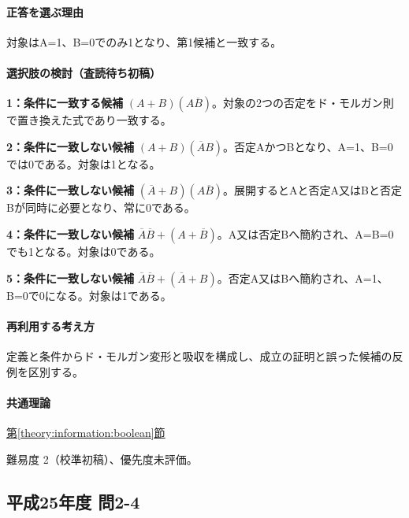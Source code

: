 \paragraph{正答を選ぶ理由} 対象はA=\allowbreak{}1、B=\allowbreak{}0でのみ1となり、第1候補と一致する。

\paragraph{選択肢の検討（査読待ち初稿）}\mbox{}\par

\noindent\textbf{1：条件に一致する候補} \((A+B)(A\overline B)\)。対象の2つの否定をド・モルガン則で置き換えた式であり一致する。\par

\noindent\textbf{2：条件に一致しない候補} \((A+B)(\overline A B)\)。否定AかつBとなり、A=\allowbreak{}1、B=\allowbreak{}0では0である。対象は1となる。\par

\noindent\textbf{3：条件に一致しない候補} \((\overline A+B)(A\overline B)\)。展開するとAと否定A又はBと否定Bが同時に必要となり、常に0である。\par

\noindent\textbf{4：条件に一致しない候補} \(\overline A\overline B+(A+\overline B)\)。A又は否定Bへ簡約され、A=\allowbreak{}B=\allowbreak{}0でも1となる。対象は0である。\par

\noindent\textbf{5：条件に一致しない候補} \(\overline A\overline B+(\overline A+B)\)。否定A又はBへ簡約され、A=\allowbreak{}1、B=\allowbreak{}0で0になる。対象は1である。\par

\paragraph{再利用する考え方} 定義と条件からド・モルガン変形と吸収を構成し、成立の証明と誤った候補の反例を区別する。

\paragraph{共通理論} \hyperref[theory:information:boolean]{第\ref*{theory:information:boolean}節}

\par 難易度 2（校準初稿）、優先度未評価。

\subsection{平成25年度 問2-4}
\label{q:h25-reg-basic-2-4}

